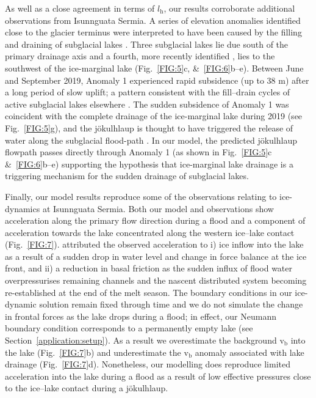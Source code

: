\documentclass[tc, manuscript]{copernicus}
\begin{document}
As well as a close agreement in terms of $l_{\mathrm{h}}$, our results corroborate additional observations from Isunnguata Sermia. A series of elevation anomalies identified close to the glacier terminus were interpreted to have been caused by the filling and draining of subglacial lakes \citep{livingstone2019brief,livingstone2025ice}. Three subglacial lakes \citep[labelled SGL 1--3 in][]{livingstone2025ice} lie due south of the primary drainage axis \citep[Fig.~\ref{FIG:5}c, \&~\ref{FIG:6}b--e][]{livingstone2019brief} and a fourth, more recently identified \citep[labelled Anomaly 1 in][]{livingstone2025ice}, lies to the southwest of the ice-marginal lake (Fig.~\ref{FIG:5}c, \&~\ref{FIG:6}b--e). Between June and September 2019, Anomaly 1 experienced rapid subsidence (up to 38 m) after a long period of slow uplift; a pattern consistent with the fill--drain cycles of active subglacial lakes elsewhere \citep{livingstone2025ice}. The sudden subsidence of Anomaly 1 was coincident with the complete drainage of the ice-marginal lake during 2019 (see Fig.~\ref{FIG:5}g), and the jökulhlaup is thought to have triggered the release of water along the subglacial flood-path \citep{livingstone2025ice}. In our model, the predicted jökulhlaup flowpath passes directly through Anomaly 1 (as shown in Fig.~\ref{FIG:5}c \&~\ref{FIG:6}b--e) supporting the hypothesis that ice-marginal lake drainage is a triggering mechanism for the sudden drainage of subglacial lakes. 

Finally, our model results reproduce some of the observations relating to ice-dynamics at Isunnguata Sermia. Both our model and observations show acceleration along the primary flow direction during a flood and a component of acceleration towards the lake concentrated along the western ice--lake contact (Fig.~\ref{FIG:7}). \citet{livingstone2025ice} attributed the observed acceleration to i) ice inflow into the lake as a result of a sudden drop in water level and change in force balance at the ice front, and ii) a reduction in basal friction as the sudden influx of flood water overpressurises remaining channels and the nascent distributed system becoming re-established at the end of the melt season. The boundary conditions in our ice-dynamic solution remain fixed through time and we do not simulate the change in frontal forces as the lake drops during a flood; in effect, our Neumann boundary condition corresponds to a permanently empty lake (see Section~\ref{application:setup}). As a result we overestimate the background $\mathrm{v}_{\mathrm{b}}$ into the lake (Fig.~\ref{FIG:7}b) and underestimate the $\mathrm{v}_{\mathrm{b}}$ anomaly associated with lake drainage (Fig.~\ref{FIG:7}d). Nonetheless, our modelling does reproduce limited acceleration into the lake during a flood as a result of low effective pressures close to the ice--lake contact during a jökulhlaup. 
\end{document}
